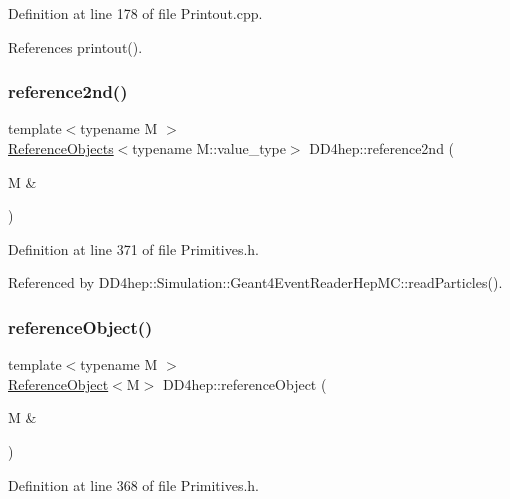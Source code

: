 Definition at line 178 of file Printout.\+cpp.



References printout().

\hypertarget{namespace_d_d4hep_a807f6ff44b17f4094a962fa879248085}{}\label{namespace_d_d4hep_a807f6ff44b17f4094a962fa879248085} 
\subsubsection{\texorpdfstring{reference2nd()}{reference2nd()}}
{\footnotesize\ttfamily template$<$typename M $>$ \\
\hyperlink{class_d_d4hep_1_1_reference_objects}{Reference\+Objects}$<$typename M\+::value\+\_\+type$>$ D\+D4hep\+::reference2nd (\begin{DoxyParamCaption}\item[{M \&}]{ }\end{DoxyParamCaption})}



Definition at line 371 of file Primitives.\+h.



Referenced by D\+D4hep\+::\+Simulation\+::\+Geant4\+Event\+Reader\+Hep\+M\+C\+::read\+Particles().

\hypertarget{namespace_d_d4hep_aab84633731b55f6c8d2dc7f01ccf82b4}{}\label{namespace_d_d4hep_aab84633731b55f6c8d2dc7f01ccf82b4} 
\subsubsection{\texorpdfstring{reference\+Object()}{referenceObject()}}
{\footnotesize\ttfamily template$<$typename M $>$ \\
\hyperlink{class_d_d4hep_1_1_reference_object}{Reference\+Object}$<$M$>$ D\+D4hep\+::reference\+Object (\begin{DoxyParamCaption}\item[{M \&}]{ }\end{DoxyParamCaption})}



Definition at line 368 of file Primitives.\+h.

\hypertarget{namespace_d_d4hep_a5af94cb0280d674c7aaca30de20011bb}{}\label{namespace_d_d4hep_a5af94cb0280d674c7aaca30de20011bb} 
